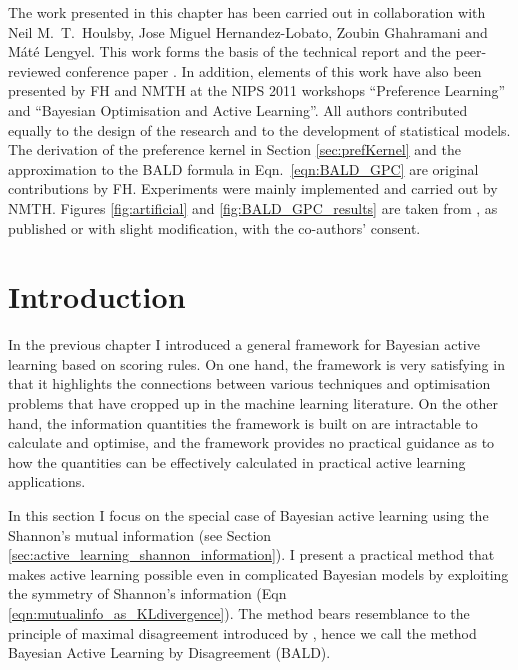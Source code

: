 

\begin{summarycontributions}
The work presented in this chapter has been carried out in collaboration with Neil M.\ T.\ Houlsby, Jose Miguel Hernandez-Lobato, Zoubin Ghahramani and M\'{a}t\'{e} Lengyel. This work forms the basis of the technical report \citep{Houlsby2011} and the peer-reviewed conference paper \citep{Houlsby2012preference}. In addition, elements of this work have also been presented by FH and NMTH at the NIPS 2011 workshops ``Preference Learning'' and ``Bayesian Optimisation and Active Learning''. All authors contributed equally to the design of the research and to the development of statistical models. The derivation of the preference kernel in Section \eqref{sec:prefKernel} and the approximation to the BALD formula in Eqn.\ \eqref{eqn:BALD_GPC} are original contributions by FH. Experiments were mainly implemented and carried out by NMTH. Figures \ref{fig:artificial} and \ref{fig:BALD_GPC_results} are taken from \citep{Houlsby2011}, as published or with slight modification, with the co-authors' consent.
\end{summarycontributions}

\section{Introduction}

In the previous chapter I introduced a general framework for Bayesian active learning based on scoring rules. On one hand, the framework is very satisfying in that it highlights the connections between various techniques and optimisation problems that have cropped up in the machine learning literature. On the other hand, the information quantities the framework is built on are intractable to calculate and optimise, and the framework provides no practical guidance as to how the quantities can be effectively calculated in practical active learning applications.

In this section I focus on the special case of Bayesian active learning using the Shannon's mutual information (see Section \ref{sec:active_learning_shannon_information}). I present a practical method that makes active learning possible even in complicated Bayesian models by exploiting the symmetry of Shannon's information (Eqn \eqref{eqn:mutualinfo_as_KLdivergence}). The method bears resemblance to the principle of maximal disagreement introduced by \citet{seung1992}, hence we call the method Bayesian Active Learning by Disagreement (BALD).

